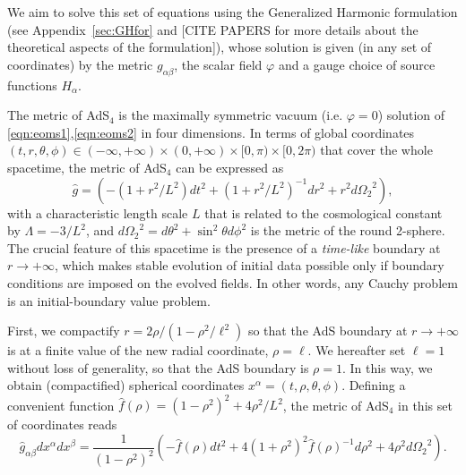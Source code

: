 \documentclass[a4paper,11pt]{article}
\begin{document}
We aim to solve this set of equations using the Generalized Harmonic formulation (see Appendix~\ref{sec:GHfor}
and [CITE PAPERS for more details about the theoretical aspects of the formulation]), 
whose solution is given (in any set of coordinates) by the metric $g_{\alpha\beta}$, the scalar field $\varphi$ and a gauge choice of source functions $H_\alpha$. 

The metric of AdS$_4$ is the maximally symmetric vacuum (i.e. $\varphi=0$) solution of \eqref{eqn:eoms1},\eqref{eqn:eoms2} in four dimensions.
In terms of global coordinates $(t,r,\theta,\phi)\in(-\infty,+\infty)\times(0,+\infty)\times[0,\pi)\times[0,2\pi)$ that cover the whole spacetime, the metric of AdS$_4$ can be expressed as
\begin{equation}\label{eqn:ads4}
\hat{g}= \left( -(1+r^2/L^2) dt^2 + (1+r^2/L^2)^{-1} dr^2 +r^2 d{\Omega_2}^2 \right), \nonumber
\end{equation}
with a characteristic length scale $L$ that is related to the cosmological constant by $\Lambda = - 3/L^2$, and $d{\Omega_2}^2 = d\theta^2 + \sin^2\theta d\phi^2$ is the metric of the round 2-sphere. The crucial feature of this spacetime is the presence of a \emph{time-like} boundary at $r \rightarrow +\infty$, which makes stable evolution of initial data possible only if boundary conditions are imposed on the evolved fields. In other words, any Cauchy problem is an initial-boundary value problem.

First, we compactify $r=2\rho/(1-\rho^2/\ell^2)$ so that the AdS boundary at $r \rightarrow +\infty$ is at a finite value of the new radial coordinate, $\rho=\ell$.
We hereafter set $\ell=1$ without loss of generality, so that the AdS boundary is $\rho=1$. In this way, we obtain (compactified) spherical coordinates $x^\alpha=(t,\rho,\theta,\phi)$.
Defining a convenient function $\hat{f}(\rho) = (1-\rho^2)^2+4\rho^2/L^2$, the metric of AdS$_4$ in this set of coordinates reads
\begin{equation}\label{eqn:ads4_compact}
\hat{g}_{\alpha\beta}dx^{\alpha}dx^{\beta} = \frac{1}{(1-\rho^2)^2} \left( -\hat{f}(\rho) dt^2 + 4(1+\rho^2)^2 \hat{f}(\rho)^{-1} d\rho^2 + 4\rho^2 d{\Omega_2}^2 \right). \nonumber
\end{equation}
\end{document}
